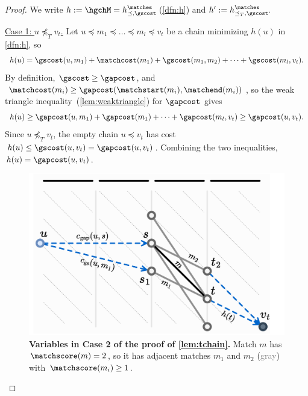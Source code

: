 \begin{proof}
  We write $h:=\hgchM = h^\matches_{\preceq,\gscost}\!$ (\cref{dfn:h}) and $h':=
  h^\matches_{\preceq_T,\gscost}\!$.

  \underline{Case 1: $u\npreceq_T v_t$.}
  Let $u\preceq m_1 \preceq \dots \preceq m_l \preceq v_t$ be a chain minimizing $h(u)$ in
  \cref{dfn:h}, so
  \begin{equation*}
   h(u) = \gscost(u, m_1) + \matchcost(m_1) + \gscost(m_1, m_2) + \dots + \gscost(m_l, v_t).
  \end{equation*}
  By definition, $\gscost \geq \gapcost$, and $\matchcost(m_i) \geq
  \gapcost(\matchstart(m_i), \matchend(m_i))$, so the weak triangle
  inequality~(\cref{lem:weaktriangle}) for $\gapcost$ gives
  \begin{equation*}
   h(u) \geq \gapcost(u, m_1) + \gapcost(m_1) + \dots + \gapcost(m_l, v_t) \geq \gapcost(u, v_t).
  \end{equation*}
  Since $u {\npreceq_T} v_t$, the empty chain $u {\preceq} v_t$ has cost $h(u)
  \leq \gscost(u, v_t) = \gapcost(u, v_t)$. Combining the two inequalities, $h(u) = \gapcost(u, v_t)$.

\begin{figure}[t]
    \centering
    \includegraphics[width=0.7\linewidth]{imgs/proofs/gch-proof.pdf}%
    \caption{\textbf{Variables in Case 2 of the proof of \cref{lem:tchain}.}
      Match $m$ has ${\matchscore(m) = 2}$, so it has adjacent matches $m_1$
      and $m_2$ (\textcolor{gray}{gray}) with $\matchscore(m_i) \geq 1$.}
    \label{fig:gch-proof}
\end{figure}


\end{proof}
